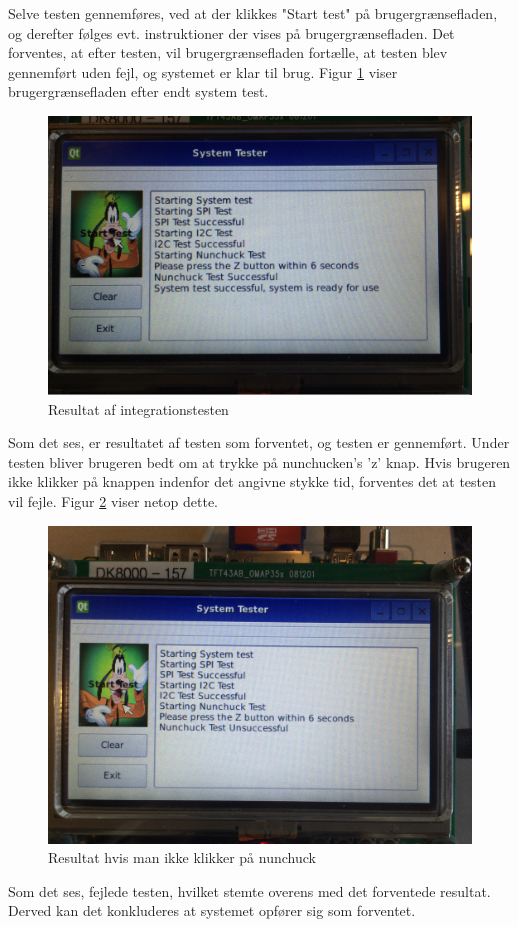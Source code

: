 Selve testen gennemføres, ved at der klikkes "Start test" på brugergrænsefladen, og derefter følges evt. instruktioner der vises på brugergrænsefladen. Det forventes, at efter testen, vil brugergrænsefladen fortælle, at testen blev gennemført uden fejl, og systemet er klar til brug. Figur \ref{figure:integrationstestresult} viser brugergrænsefladen efter endt system test.

\begin{figure}[H]
	\centering
	\includegraphics[width=\textwidth]{Test/images/IntegrationstestProtokoller/resultat2}
	\caption{Resultat af integrationstesten}
	\label{figure:integrationstestresult}
\end{figure}

Som det ses, er resultatet af testen som forventet, og testen er gennemført. Under testen bliver brugeren bedt om at trykke på nunchucken's 'z' knap. Hvis brugeren ikke klikker på knappen indenfor det angivne stykke tid, forventes det at testen vil fejle. Figur \ref{figure:integrationstestresult1} viser netop dette.


\begin{figure}[H]
	\centering
	\includegraphics[width=\textwidth]{Test/images/IntegrationstestProtokoller/resultat1}
	\caption{Resultat hvis man ikke klikker på nunchuck}
	\label{figure:integrationstestresult1}
\end{figure}

Som det ses, fejlede testen, hvilket stemte overens med det forventede resultat. Derved kan det konkluderes at systemet opfører sig som forventet.
